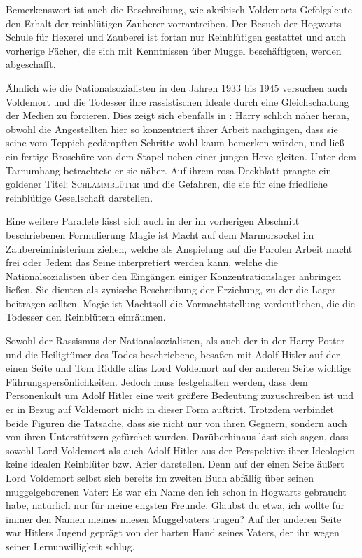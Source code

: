 Bemerkenswert ist auch die Beschreibung, wie akribisch Voldemorts Gefolgsleute den \glqq Erhalt\grqq{} der reinblütigen Zauberer vorrantreiben.
Der Besuch der Hogwarts-Schule für Hexerei und Zauberei ist fortan nur Reinblütigen gestattet und auch vorherige Fächer, die sich mit Kenntnissen über Muggel beschäftigten, werden abgeschafft. 

Ähnlich wie die Nationalsozialisten in den Jahren 1933 bis 1945 versuchen auch Voldemort und die Todesser ihre rassistischen Ideale durch eine \glqq Gleichschaltung\grqq{} der Medien zu forcieren.
Dies zeigt sich ebenfalls in \cite[S.\,256]{JKR10}: \glqq Harry schlich näher heran, obwohl die Angestellten hier so konzentriert ihrer Arbeit nachgingen, dass sie seine vom Teppich gedämpften Schritte wohl kaum bemerken würden, und ließ ein fertige Broschüre von dem Stapel neben einer jungen Hexe gleiten. Unter dem Tarnumhang betrachtete er sie näher. Auf ihrem rosa Deckblatt prangte ein goldener Titel: \textsc{Schlammblüter} und die Gefahren, die sie für eine friedliche reinblütige Gesellschaft darstellen\grqq.

Eine weitere Parallele lässt sich auch in der im vorherigen Abschnitt beschriebenen Formulierung \glqq Magie ist Macht\grqq{} auf dem Marmorsockel im Zaubereiministerium ziehen, welche als Anspielung auf die Parolen  \glqq Arbeit macht frei\grqq{} oder \glqq Jedem das Seine\grqq{} interpretiert werden kann, welche die Nationalsozialisten über den Eingängen einiger Konzentrationslager anbringen ließen.
Sie dienten als zynische Beschreibung der \glqq Erziehung\grqq, zu der die Lager beitragen sollten.
\glqq Magie ist Macht\grqq soll die Vormachtstellung verdeutlichen, die die Todesser den \glqq Reinblütern\grqq{} einräumen.

Sowohl der Rassismus der Nationalsozialisten, als auch der in der \glqq Harry Potter und die Heiligtümer des Todes\grqq{} beschriebene, besaßen mit Adolf Hitler auf der einen Seite und Tom Riddle alias Lord Voldemort auf der anderen Seite wichtige Führungspersönlichkeiten.
Jedoch muss festgehalten werden, dass dem Personenkult um Adolf Hitler eine weit größere Bedeutung zuzuschreiben ist und er in Bezug auf Voldemort nicht in dieser Form auftritt.
Trotzdem verbindet beide Figuren die Tatsache, dass sie nicht nur von ihren Gegnern, sondern auch von ihren Unterstützern gefürchet wurden\cite[S.\,15]{JKR10}. 
Darüberhinaus lässt sich sagen, dass sowohl Lord Voldemort als auch Adolf Hitler aus der Perspektive ihrer Ideologien keine \glqq idealen\grqq{} Reinblüter bzw. Arier darstellen.
Denn auf der einen Seite äußert Lord Voldemort selbst sich bereits im zweiten Buch abfällig über seinen muggelgeborenen Vater: \glqq Es war ein Name den ich schon in Hogwarts gebraucht habe, natürlich nur für meine engsten Freunde. Glaubst du etwa, ich wollte für immer den Namen meines miesen Muggelvaters tragen?\grqq{}\cite[S.\,323]{JKR98}
Auf der anderen Seite war Hitlers Jugend geprägt von der harten Hand seines Vaters, der ihn wegen seiner Lernunwilligkeit schlug.\cite[S.\,21f]{BH97} 

